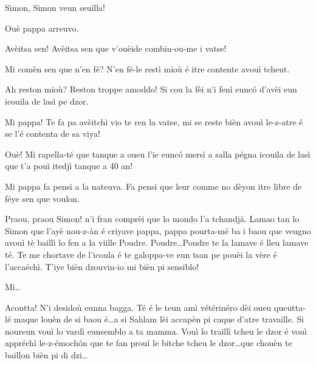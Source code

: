 \begin{drama}

\Cienspeaks Simon, Simon veun seuilla!

\Simonspeaks Ouè pappa arreuvo.

\Cienspeaks Avèitsa sen! Avèitsa sen que v'ouèide combin-ou-me i vatse!

\Simonspeaks Mi comèn sen que n’en fé? N’en fé-le restì mioù é itre contente avouì tcheut. 

\Cienspeaks Ah reston mioù? Reston troppe amoddo! Si cou la fèi n'i fenì eunc\'o d'avèi eun icouila de lasì pe dzor. 

\Simonspeaks Mi pappa! Te fa pa avèitchì vio te ren la vatse, mi se reste bièn avouì le-z-atre é se l’é contenta de sa viya!

\Cienspeaks Ouè! Mi rapella-té que tanque a oueu l'ie eunc\'o mersì a salla pégna icouila de lasì que t'a pouì itedjì tanque a 40 an! 

\Simonspeaks{} Mi pappa fa pensì a la nateuva. Fa pensì que leur comme no dèyon itre libre de féye sen que voulon.

\Cienspeaks Praou, praou Simon! n’i fran comprèi que lo mondo l’a tchandjà. Lamao tan lo Simon que l’ayè nou-z-àn é criyave pappa, pappa pourta-mé ba i baou que veugno avouì tè baillì lo fen a la viille Poudre. Poudre\ldots Poudre te la lamave é lleu lamave té. Te me chortave de l’icoula é te galoppa-ve eun tsan pe pouèi la vère é l’accaéchì. T'iye bièn dzouvin-io mi bièn pi sensiblo!

\Simonspeaks Mi\ldots

\Cienspeaks Acoutta! N’i desidoù eunna bagga. Té é le teun amì vétérinéro dèi oueu queutta-lé maque louèn de si baou é\ldots a si Sahlam lèi accapèn pi caque d’atre travaille. Si noureun vouì lo vardì  eunsemblo a ta mamma. Vouì lo traillì tcheu le dzor é vouì appréchì le-z-émoch\'on que te fan prouì le bitche tcheu le dzor\ldots que chouèn te baillon bièn pi di dzi\ldots

\ridocliou

\DeriLeRido
{}

\end{drama}